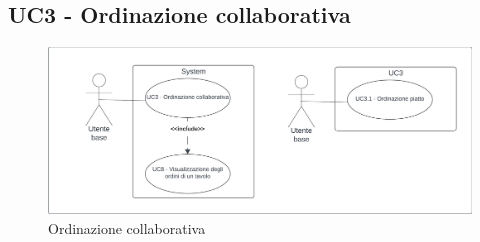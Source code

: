 \subsection{UC3 - Ordinazione collaborativa}\label{usecase:3}

\begin{figure}[H]
    \centering
    \includegraphics[width=0.9\linewidth]{ucd/UCD3_nuovo.png}
    \caption{Ordinazione collaborativa}
\end{figure}

